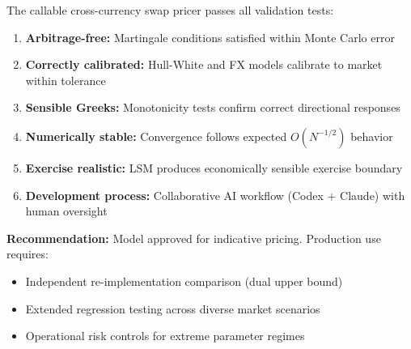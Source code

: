 \documentclass[11pt,a4paper]{article}
\begin{document}
The callable cross-currency swap pricer passes all validation tests:

\begin{enumerate}
    \item \textbf{Arbitrage-free:} Martingale conditions satisfied within Monte Carlo error
    \item \textbf{Correctly calibrated:} Hull-White and FX models calibrate to market within tolerance
    \item \textbf{Sensible Greeks:} Monotonicity tests confirm correct directional responses
    \item \textbf{Numerically stable:} Convergence follows expected $O(N^{-1/2})$ behavior
    \item \textbf{Exercise realistic:} LSM produces economically sensible exercise boundary
    \item \textbf{Development process:} Collaborative AI workflow (Codex + Claude) with human oversight
\end{enumerate}

\noindent\textbf{Recommendation:} Model approved for indicative pricing. Production use requires:
\begin{itemize}
    \item Independent re-implementation comparison (dual upper bound)
    \item Extended regression testing across diverse market scenarios
    \item Operational risk controls for extreme parameter regimes
\end{itemize}
\end{document}
